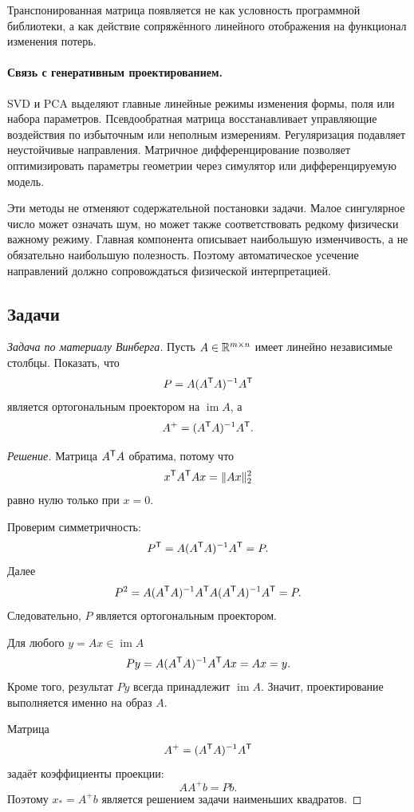 Транспонированная матрица появляется не как условность программной библиотеки, а как действие сопряжённого линейного отображения на функционал изменения потерь.

\paragraph{Связь с генеративным проектированием.}

SVD и PCA выделяют главные линейные режимы изменения формы, поля или набора параметров. Псевдообратная матрица восстанавливает управляющие воздействия по избыточным или неполным измерениям. Регуляризация подавляет неустойчивые направления. Матричное дифференцирование позволяет оптимизировать параметры геометрии через симулятор или дифференцируемую модель.

Эти методы не отменяют содержательной постановки задачи. Малое сингулярное число может означать шум, но может также соответствовать редкому физически важному режиму. Главная компонента описывает наибольшую изменчивость, а не обязательно наибольшую полезность. Поэтому автоматическое усечение направлений должно сопровождаться физической интерпретацией.

\subsection*{Задачи}

\begin{problem}
\textit{Задача по материалу Винберга.}
Пусть \(A\in\mathbb{R}^{m\times n}\) имеет линейно независимые столбцы. Показать, что
\[
P=A(A^{\mathsf{T}}A)^{-1}A^{\mathsf{T}}
\]
является ортогональным проектором на \(\operatorname{im}A\), а
\[
A^+=(A^{\mathsf{T}}A)^{-1}A^{\mathsf{T}}.
\]
\end{problem}

\begin{proof}[Решение]
Матрица \(A^{\mathsf{T}}A\) обратима, потому что
\[
x^{\mathsf{T}}A^{\mathsf{T}}Ax
=
\|Ax\|_2^2
\]
равно нулю только при \(x=0\).

Проверим симметричность:
\[
P^{\mathsf{T}}
=
A(A^{\mathsf{T}}A)^{-1}A^{\mathsf{T}}
=
P.
\]
Далее
\[
P^2
=
A(A^{\mathsf{T}}A)^{-1}
A^{\mathsf{T}}A
(A^{\mathsf{T}}A)^{-1}A^{\mathsf{T}}
=
P.
\]
Следовательно, \(P\) является ортогональным проектором.

Для любого \(y=Ax\in\operatorname{im}A\)
\[
Py
=
A(A^{\mathsf{T}}A)^{-1}A^{\mathsf{T}}Ax
=
Ax=y.
\]
Кроме того, результат \(Py\) всегда принадлежит \(\operatorname{im}A\). Значит, проектирование выполняется именно на образ \(A\).

Матрица
\[
A^+=(A^{\mathsf{T}}A)^{-1}A^{\mathsf{T}}
\]
задаёт коэффициенты проекции:
\[
AA^+b=Pb.
\]
Поэтому \(x_*=A^+b\) является решением задачи наименьших квадратов.
\end{proof}

